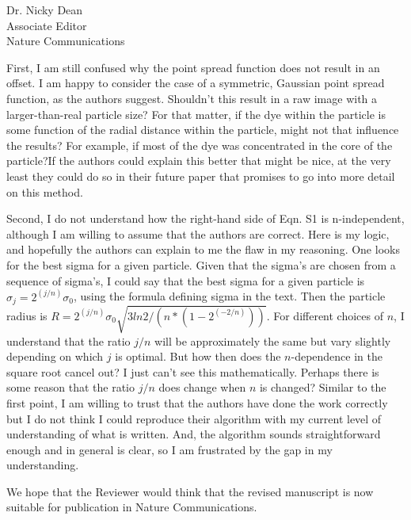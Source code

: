 \documentclass[a4paper, rebuttal, parskip=true, firsthead=false, fromemail=true, foldmarks=false]{scrlttr2}
\begin{document}
\begin{letter}{Dr. Nicky Dean\\
Associate Editor\\
Nature Communications}
\begin{quotationi}
First, I am still confused why the point spread function does not result in an offset. I am happy to consider the case of a symmetric, Gaussian point spread function, as the authors suggest. Shouldn't this result in a raw image with a larger-than-real particle size? For that matter, if the dye within the particle is some function of the radial distance within the particle, might not that influence the results? For example, if most of the dye was concentrated in the core of the particle?If the authors could explain this better that might be nice, at the very least they could do so in their future paper that promises to go into more detail on this method.

Second, I do not understand how the right-hand side of Eqn. S1 is n-independent, although I am willing to assume that the authors are correct. Here is my logic, and hopefully the authors can explain to me the flaw in my reasoning. One looks for the best sigma for a given particle. Given that the sigma's are chosen from a sequence of sigma's, I could say that the best sigma for a given particle is $\sigma_j = 2^(j/n) \sigma_0$, using the formula defining sigma in the text. Then the particle radius is $R = 2^(j/n) \sigma_0 \sqrt{3 ln 2 / (n*(1-2^(-2/n)))}$. For different choices of $n$, I understand that the ratio $j/n$ will be approximately the same but vary slightly depending on which $j$ is optimal. But how then does the $n$-dependence in the square root cancel out? I just can't see this mathematically. Perhaps there is some reason that the ratio $j/n$ does change when $n$ is changed? Similar to the first point, I am willing to trust that the authors have done the work correctly but I do not think I could reproduce their algorithm with my current level of understanding of what is written. And, the algorithm sounds straightforward enough and in general is clear, so I am frustrated by the gap in my understanding.
\end{quotationi}


We hope that the Reviewer would think that the revised manuscript is now suitable for publication in Nature Communications. 


\end{letter} 
\end{document}
